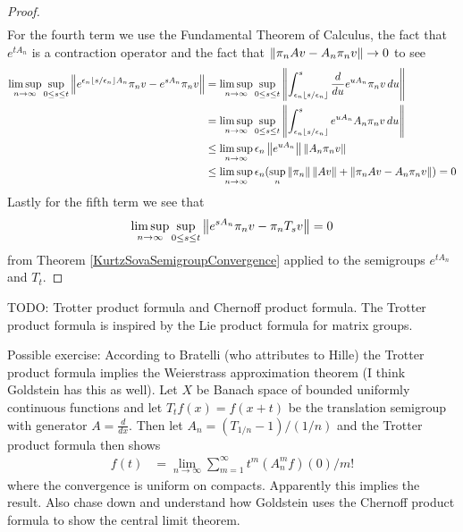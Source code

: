 \begin{proof}
\begin{align*}
\end{align*}
For the fourth term we use the Fundamental Theorem of Calculus, the fact that $e^{tA_n}$ is a contraction operator and the fact that $\left \lVert \pi_n A v - A_n \pi_n v \right \rVert \to 0$ to see
\begin{align*}
\limsup_{n \to \infty} \sup_{0 \leq s \leq t} \left \lVert e^{\epsilon_n \left \lfloor s/\epsilon_n \right \rfloor A_n} \pi_n v - e^{s A_n} \pi_n v \right \rVert 
&=\limsup_{n \to \infty} \sup_{0 \leq s \leq t} \left \lVert \int^s_{\epsilon_n \left \lfloor s/\epsilon_n \right \rfloor} \frac{d}{du} e^{uA_n} \pi_n v \, du \right \rVert \\
&=\limsup_{n \to \infty} \sup_{0 \leq s \leq t} \left \lVert \int^s_{\epsilon_n \left \lfloor s/\epsilon_n \right \rfloor} e^{uA_n} A_n \pi_n v \, du \right \rVert \\
&\leq \limsup_{n \to \infty} \epsilon_n \left \lVert e^{uA_n} \right \rVert \left \lVert  A_n \pi_n v  \right \rVert\\
&\leq \limsup_{n \to \infty} \epsilon_n (\sup_n \left \lVert \pi_n \right \rVert \left \lVert Av \right \rVert +  \left \lVert \pi_n A v - A_n \pi_n v  \right \rVert) = 0\\
\end{align*}
Lastly for the fifth term we see that 
\begin{align*}
\limsup_{n \to \infty} \sup_{0 \leq s \leq t} \left \lVert e^{s A_n} \pi_n v - \pi_n T_s v \right \rVert = 0
\end{align*}
from Theorem \ref{KurtzSovaSemigroupConvergence} applied to the semigroups $e^{t A_n}$ and $T_t$.
\end{proof}

TODO: Trotter product formula and Chernoff product formula.  The Trotter product formula is inspired by the Lie product formula for matrix groups.

Possible exercise: According to Bratelli (who attributes to Hille) the Trotter product formula implies the Weierstrass approximation theorem (I think Goldstein has this as well).  Let $X$ be Banach space of bounded uniformly continuous functions and let $T_tf(x) = f(x+t)$ be the translation semigroup with generator $A=\frac{d}{dx}$.  Then let $A_n = (T_{1/n} -1)/(1/n)$ and the Trotter product formula then shows 
\begin{align*}
f(t) &= \lim_{n \to \infty} \sum_{m=1}^\infty t^m (A^m_n f)(0)/m!
\end{align*} 
where the convergence is uniform on compacts.  Apparently this implies the result.  Also chase down and understand how Goldstein uses the Chernoff product formula to show the central limit theorem.
